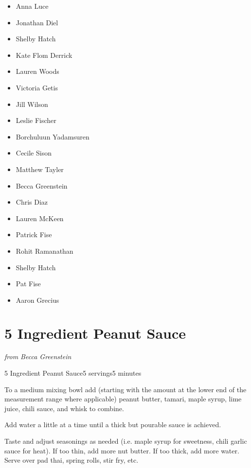\documentclass[openany]{book}
\providecommand{\tightlist}{%
  \setlength{\itemsep}{0pt}\setlength{\parskip}{0pt}}
\begin{document}
\begin{itemize}
\tightlist
\item
  Anna Luce
\item
  Jonathan Diel
\item
  Shelby Hatch
\item
  Kate Flom Derrick
\item
  Lauren Woods
\item
  Victoria Getis
\item
  Jill Wilson
\item
  Leslie Fischer
\item
  Borchuluun Yadamsuren
\item
  Cecile Sison
\item
  Matthew Tayler
\item
  Becca Greenstein
\item
  Chris Diaz
\item
  Lauren McKeen
\item
  Patrick Fise
\item
  Rohit Ramanathan
\item
  Shelby Hatch
\item
  Pat Fise
\item
  Aaron Grecius
\end{itemize}

\chapter{5 Ingredient Peanut Sauce}\label{ingredient-peanut-sauce}

\emph{from Becca Greenstein}

\begin{recipe}{5 Ingredient Peanut Sauce}{5 servings}{5 minutes}

To a medium mixing bowl add (starting with the amount at the lower end of the measurement range where applicable) peanut butter, tamari, maple syrup, lime juice, chili sauce, and whisk to combine.


Add water a little at a time until a thick but pourable sauce is achieved.

\newstep Taste and adjust seasonings as needed (i.e. maple syrup for sweetness, chili garlic sauce for heat). If too thin, add more nut butter. If too thick, add more water.
\newstep Serve over pad thai, spring rolls, stir fry, etc.

\end{recipe}
\end{document}
